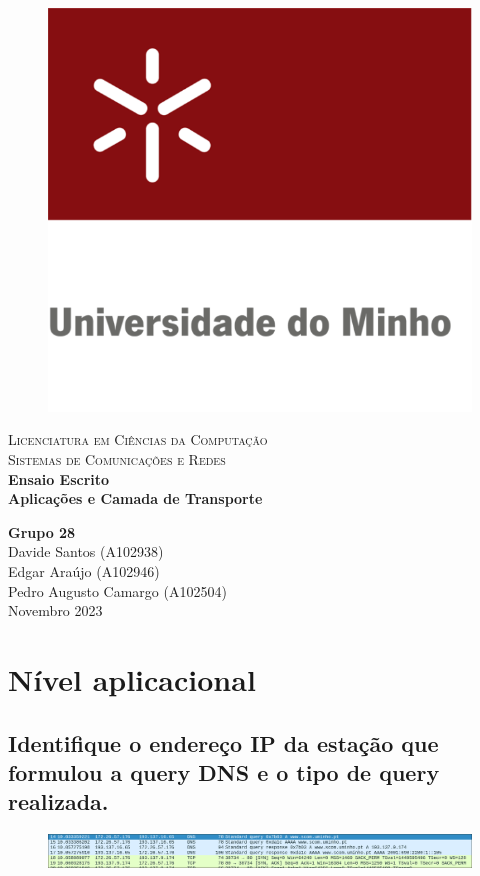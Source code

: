 \documentclass{article}
\begin{document}
\begin{titlepage}

\center %

\newcommand{\HRule}{\rule{\linewidth}{0.4mm}} %

\begin{figure}[h]
    \centering
    \includegraphics[width=0.24\linewidth]{images/uniMinho.jpg}
\end{figure}

\textsc{\Large Licenciatura em Ciências da Computação}\\[0.4cm] %
\textsc{\Large Sistemas de Comunicações e Redes}\\[5cm]

{\Large\bfseries Ensaio Escrito}\\[0.5cm]
{\LARGE \bfseries Aplicações e Camada de Transporte} %


\vspace{5cm} %
{\bfseries Grupo 28} \\ \vspace{3mm}
Davide Santos (A102938) \\ \vspace{3mm}
Edgar Araújo (A102946) \\ \vspace{3mm}
Pedro Augusto Camargo (A102504) \\ \vspace{3mm}
\vspace{0.2cm}
{Novembro 2023}\\[0.2cm] %

\vfill %
\end{titlepage}

\tableofcontents
\pagebreak

\section{Nível aplicacional}
\subsection{Identifique o endereço IP da estação que formulou a query DNS e o tipo de query realizada.}
\begin{figure}[h]
    \centering
    \includegraphics[width=1\linewidth]{images/dns.png}
\end{figure}
\end{document}

